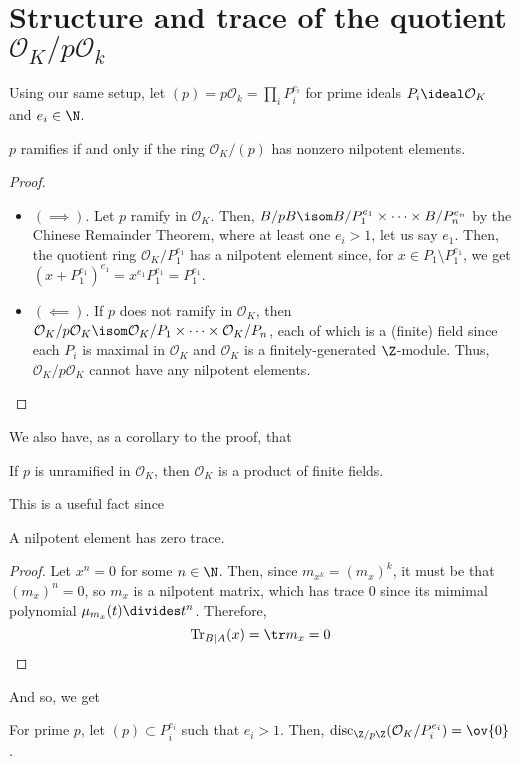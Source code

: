 \documentclass[11pt,leqno,oneside]{amsart}
\numberwithin{thm}{section}
\renewcommand{\O}{\mathcal{O}}
\newcommand{\disc}{\operatorname{disc}}
\newcommand{\Tr}{\operatorname{Tr}}
\begin{document}
\section{Structure and trace of the quotient \(\O_K/p\O_k\)}
Using our same setup, let \((p) = p\O_k = \prod_i P_i^{e_i}\) for
prime ideals \(P_i \ideal \O_K\) and \(e_i \in \N\). 
\begin{lem}\label{p-ramifies-iff-nilp}
  \(p\) ramifies if and only if the ring \(\O_K/(p)\) has nonzero
  nilpotent elements.
\end{lem}
\begin{proof}
  \begin{itemize}
    \item \((\implies)\). Let \(p\) ramify in \(\O_K\). Then, \(B/pB
      \isom B/P_1^{e_1}\times \cdots \times B/P_n^{e_n}\) by the
      Chinese Remainder Theorem, where at
      least one \(e_i > 1\), let us say \(e_1\). Then, the quotient
      ring \(\O_K/P_1^{e_1}\) has a nilpotent element since, for \(x \in
      P_1 \setminus P_1^{e_1}\), we get \((x+P_1^{e_1})^{e_1} =
      x^{e_1} P_1^{e_1} = P_1^{e_1}\).
    \item \((\impliedby)\). If \(p\) does not ramify in \(\O_K\), then
      \(\O_K/p\O_K \isom \O_K/P_1 \times \cdots \times \O_K/P_n\), each of which
      is a (finite) field since each \(P_i\) is maximal in
      \(\O_K\) and \(\O_K\) is a finitely-generated \(\Z\)-module. Thus,
      \(\O_K/p\O_K\) cannot have any nilpotent elements. 
    \end{itemize}
  \end{proof}
We also have, as a corollary to the proof, that
\begin{cor}\label{unramified-gives-prod-of-finite-fields}
  If \(p\) is unramified in \(\O_K\), then \(\O_K\) is a product of
  finite fields. 
\end{cor}
This is a useful fact since
\begin{lem}\label{nilp-elt-has-zero-trace}
  A nilpotent element has zero trace.
\end{lem}
\begin{proof}
  Let \(x^n = 0\) for some \(n \in \N\). Then, since \(m_{x^k} =
  (m_x)^k\), it must be that \((m_x)^n = 0\), so \(m_x\) is a
  nilpotent matrix, which has trace \(0\) since its mimimal
  polynomial \(\mu_{m_x}(t) \divides t^n\). Therefore, \[
    \Tr_{B|A}(x) = \tr m_{x} = 0
  \]
\end{proof}
And so, we get
\begin{lem}\label{nilp-elt-gives-disc-zero-mod-p}
  For prime \(p\), let \((p) \subset
  P_i^{e_i}\) such that \(e_i > 1\). Then,
  \(\disc_{\Z/p\Z}(\O_K/P_i^{e_i}) = \ov{0}\).
\end{lem}
\end{document}
